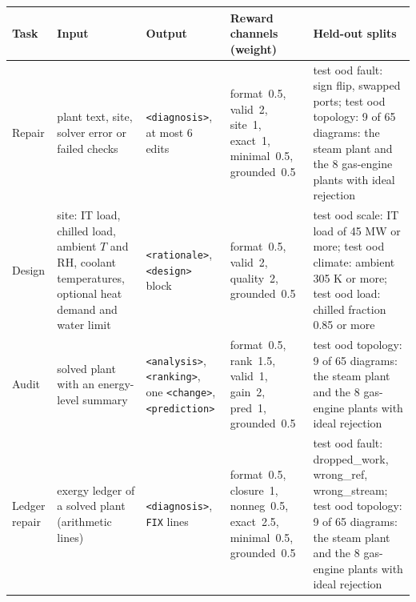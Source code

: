 \begingroup\scriptsize\renewcommand{\arraystretch}{1.2}
\begin{tabular}{@{}p{1.5cm}p{3.2cm}p{2.8cm}p{3.3cm}p{3.3cm}@{}}
\toprule
Task & Input & Output & Reward channels (weight) & Held-out splits \\
\midrule
Repair & plant text, site, solver error or failed checks & \texttt{<diagnosis>}, at most 6 edits & format~0.5, valid~2, site~1, exact~1, minimal~0.5, grounded~0.5 & test ood fault: sign flip, swapped ports; test ood topology: 9 of 65 diagrams: the steam plant and the 8 gas-engine plants with ideal rejection \\
Design & site: IT load, chilled load, ambient $T$ and RH, coolant temperatures, optional heat demand and water limit & \texttt{<rationale>}, \texttt{<design>} block & format~0.5, valid~2, quality~2, grounded~0.5 & test ood scale: IT load of 45 MW or more; test ood climate: ambient 305 K or more; test ood load: chilled fraction 0.85 or more \\
Audit & solved plant with an energy-level summary & \texttt{<analysis>}, \texttt{<ranking>}, one \texttt{<change>}, \texttt{<prediction>} & format~0.5, rank~1.5, valid~1, gain~2, pred~1, grounded~0.5 & test ood topology: 9 of 65 diagrams: the steam plant and the 8 gas-engine plants with ideal rejection \\
Ledger repair & exergy ledger of a solved plant (arithmetic lines) & \texttt{<diagnosis>}, \texttt{FIX} lines & format~0.5, closure~1, nonneg~0.5, exact~2.5, minimal~0.5, grounded~0.5 & test ood fault: dropped\_work, wrong\_ref, wrong\_stream; test ood topology: 9 of 65 diagrams: the steam plant and the 8 gas-engine plants with ideal rejection \\
\bottomrule
\end{tabular}\endgroup
